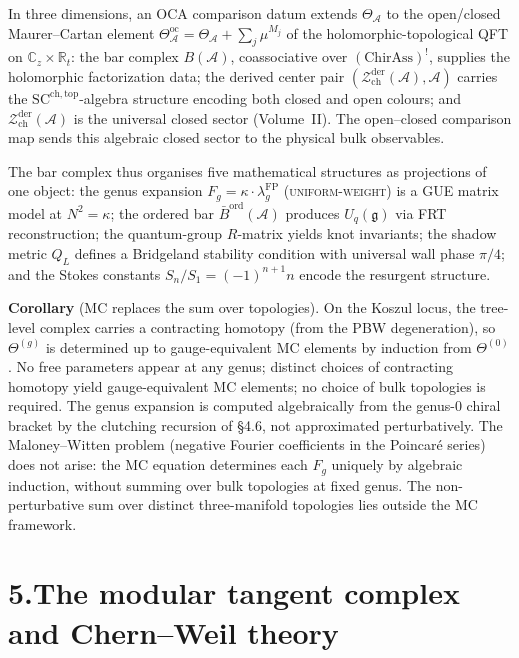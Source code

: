\documentclass[11pt]{report}
\theoremstyle{definition}
\theoremstyle{remark}
\providecommand{\cA}{\mathcal{A}}
\providecommand{\cZ}{\mathcal{Z}}
\providecommand{\barB}{\bar{B}}
\providecommand{\SCchtop}{\mathrm{SC}^{\mathrm{ch,top}}}
\numberwithin{equation}{section}
\begin{document}
In three dimensions, an OCA comparison datum extends $\Theta_\cA$ to
the open/closed Maurer--Cartan element
$\Theta^{\mathrm{oc}}_\cA=\Theta_\cA+\sum_j\mu^{M_j}$
of the holomorphic-topological QFT on
$\mathbb C_z\times\mathbb R_t$: the bar complex $B(\cA)$, coassociative over $(\mathrm{ChirAss})^!$,
supplies the holomorphic factorization data; the derived center pair
$(\cZ^{\mathrm{der}}_{\mathrm{ch}}(\cA), \cA)$ carries the
$\SCchtop$-algebra structure encoding both closed and open colours;
and $\cZ^{\mathrm{der}}_{\mathrm{ch}}(\cA)$ is the universal closed sector
(Volume~II).  The open--closed comparison map sends this algebraic
closed sector to the physical bulk observables.

The bar complex thus organises five mathematical structures as
projections of one object: the genus expansion
$F_g=\kappa\cdot\lambda_g^{\mathrm{FP}}$ \textsc{(uniform-weight)} is
a GUE matrix model at $N^2=\kappa$; the ordered bar
$\barB^{\mathrm{ord}}(\cA)$ produces $U_q(\mathfrak g)$ via FRT
reconstruction; the quantum-group $R$-matrix yields knot invariants;
the shadow metric $Q_L$ defines a Bridgeland stability condition with
universal wall phase $\pi/4$; and the Stokes constants
$S_n/S_1=(-1)^{n+1}n$ encode the resurgent structure.

\medskip
\noindent\textbf{Corollary} (MC replaces the sum over topologies).
On the Koszul locus, the tree-level complex carries a contracting
homotopy (from the PBW degeneration), so $\Theta^{(g)}$ is determined
up to gauge-equivalent MC elements by induction from $\Theta^{(0)}$.
No free parameters appear at any genus; distinct choices of
contracting homotopy yield gauge-equivalent MC elements; no choice of
bulk topologies is required. The genus expansion is computed
algebraically from the genus-$0$ chiral bracket by the clutching
recursion of \S4.6, not approximated perturbatively. The
Maloney--Witten problem (negative Fourier coefficients in the
Poincar\'e series) does not arise: the MC equation determines each
$F_g$ uniquely by algebraic induction, without summing over bulk
topologies at fixed genus. The non-perturbative sum over distinct
three-manifold topologies lies outside the MC framework.


\section*{5.\quad The modular tangent complex and Chern--Weil theory}
\end{document}
